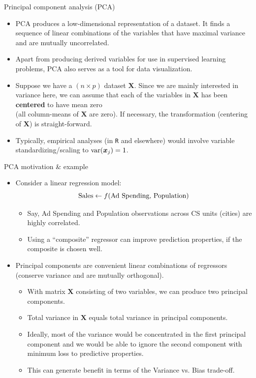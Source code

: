 \documentclass{beamer}
\begin{document}
\begin{frame}{Principal component analysis (PCA)}
\begin{itemize}
\item PCA produces a low-dimensional representation of a dataset. It finds a sequence of linear combinations of the variables that have maximal variance and are mutually uncorrelated.
\medskip
\item Apart from producing derived variables for use in supervised learning problems, PCA also serves as a tool for data visualization.
\medskip
\item Suppose we have a $(n \! \times \! p)$ dataset $\bm{X}$. Since we are mainly interested in variance here, we can assume that each of the variables in $\bm{X}$ has been \textbf{centered} to have mean zero \\(all column-means of $\bm{X}$ are zero). If necessary, the transformation (centering of $\bm{X}$) is straight-forward.
\medskip
\item Typically, empirical analyses (in \texttt{R} and elsewhere) would involve variable standardizing/scaling to $\textnormal{var}(\bm{x}_j)=1$.
\end{itemize}
\end{frame}
\begin{frame}{PCA motivation \& example}
\begin{itemize}
    \item Consider a linear regression model:
    $$
    \textnormal{Sales} \leftarrow f(\textnormal{Ad Spending, Population})
    $$
    \vspace{-0.5cm}
    \begin{itemize}
        \item Say, Ad Spending and Population observations across CS units (cities) are highly correlated.
        \item Using a ``composite'' regressor can improve prediction properties, if the composite is chosen well.
    \end{itemize}
    \medskip
    \item Principal components are convenient linear combinations of regressors (conserve variance and are mutually orthogonal).
    \begin{itemize}
        \item With matrix $\bm{X}$ consisting of two variables, we can produce two principal components.
        \item Total variance in $\bm{X}$ equals total variance in principal components. 
        \item Ideally, most of the variance would be concentrated in the first principal component and we would be able to ignore the second component with minimum loss to predictive properties.
        \item This can generate benefit in terms of the Variance vs. Bias trade-off. 
    \end{itemize}
\end{itemize}
\end{frame}
\end{document}
